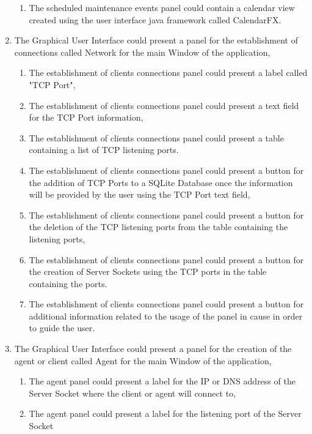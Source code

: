 \begin{enumerate}
    \begin{enumerate}
        \item The scheduled maintenance events panel could contain a calendar view created using the user
        interface java framework called CalendarFX.
    \end{enumerate}
    \item The Graphical User Interface could present a panel for the establishment of connections called Network
    for the main Window of the application,
    \begin{enumerate}
        \item The establishment of clients connections panel could present a label called "TCP Port",
        \item The establishment of clients connections panel could present a text field for the
        TCP Port information,
        \item The establishment of clients connections panel could present a table containing a list of TCP
        listening ports.
        \item The establishment of clients connections panel could present a button for the addition of TCP Ports
        to a SQLite Database once the information will be provided by the user using the TCP Port text field,
        \item The establishment of clients connections panel could present a button for the deletion of the TCP
        listening ports from the table containing the listening ports,
        \item The establishment of clients connections panel could present a button for the creation of Server Sockets
        using the TCP ports in the table containing the ports.
        \item The establishment of clients connections panel could present a button for additional information
        related to the usage of the panel in cause in order to guide the user.
    \end{enumerate}
    \newpage
    \item The Graphical User Interface could present a panel for the creation of the agent or client called Agent
    for the main Window of the application,
    \begin{enumerate}
        \item The agent panel could present a label for the IP or DNS address of the Server Socket
        where the client or agent will connect to,
        \item The agent panel could present a label for the listening port of the Server Socket

\end{enumerate}
\end{enumerate}
